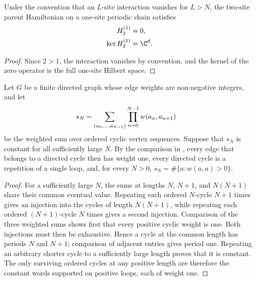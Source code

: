 \begin{lemma}
    \label{thm:project_local_one_site_parent_hamiltonian_zero}
    \leanok
    Under the convention that an $L$-site interaction vanishes for $L>N$, the
    two-site parent Hamiltonian on a one-site periodic chain satisfies
    \begin{align}
        H_2^{(1)}      & = 0, \notag    \\
        \ker H_2^{(1)} & = \C^d. \notag
    \end{align}
\end{lemma}

\begin{proof}\leanok
    Since $2>1$, the interaction vanishes by convention, and the kernel of the zero
    operator is the full one-site Hilbert space.
\end{proof}

\begin{lemma}
    \label{thm:beigi_eventually_constant_sector_graph}
    \leanok
    Let $G$ be a finite directed graph whose edge weights are non-negative
    integers, and let
    \begin{align}
        s_N
         & =
        \sum_{(a_0,\ldots,a_{N-1})}
        \prod_{n=0}^{N-1}w(a_n,a_{n+1}) \notag
    \end{align}
    be the weighted sum over ordered cyclic vertex sequences. Suppose that
    $s_N$ is constant for all sufficiently large $N$. By the comparison in
    \cite[Section~IV]{Beigi2012Classification}, every edge that
    belongs to a directed cycle then has weight one, every directed cycle is a
    repetition of a single loop, and, for every $N>0$,
    $s_N=\#\{a:w(a,a)>0\}$.
\end{lemma}

\begin{proof}\leanok
    For a sufficiently large $N$, the sums at lengths $N$,
    $N+1$, and $N(N+1)$ share their common eventual value. Repeating each
    ordered $N$-cycle $N+1$ times gives an injection into the cycles of length
    $N(N+1)$, while repeating each ordered $(N+1)$-cycle $N$ times gives a
    second injection. Comparison of the three weighted sums shows first that
    every positive cyclic weight is one. Both injections must then be
    exhaustive. Hence a cycle at the common length has periods $N$ and
    $N+1$; comparison of adjacent entries gives period one. Repeating an
    arbitrary shorter cycle to a sufficiently large length proves that it is
    constant. The only surviving ordered cycles at any positive length are
    therefore the constant words supported on positive loops, each of weight
    one.
\end{proof}

